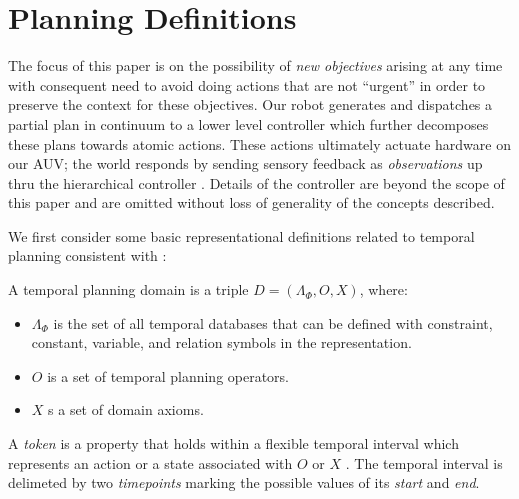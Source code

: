 \section{Planning Definitions}
\label{sec: defs}

The focus of this paper is on the possibility of \emph{new objectives}
arising at any time with consequent need to avoid doing actions that
are not ``urgent'' in order to preserve the context for these
objectives. Our robot generates and dispatches a partial plan in
continuum to a lower level controller which further decomposes these
plans towards atomic actions. These actions ultimately actuate
hardware on our AUV; the world responds by sending sensory feedback as
\emph{observations} up thru the hierarchical controller
\cite{mcgann08bdup,rajan12dup}. Details of the controller are beyond
the scope of this paper and are omitted without loss of generality of
the concepts described.

We first consider some basic representational definitions related to
temporal planning consistent with \cite{Nau:2004}:


\begin{definition}
  \label{def:domain}
  A temporal planning domain is a triple $D = ( \Lambda_\Phi, O, X )$, where:
  \begin{itemize}
  \item $\Lambda_\Phi$ is the set of all temporal databases that can
    be defined with constraint, constant, variable, and relation
    symbols in the representation.
  \item $O$ is a set of temporal planning operators.
  \item $X$ s a set of domain axioms.
  \end{itemize}
\end{definition}

A \emph{token} is a property that holds within a flexible temporal
interval which represents an action or a state associated with $O$ or
$X$ \cite{py10dup}. The temporal interval is delimeted by two 
{\em timepoints} marking the possible values of its {\em start} and
{\em end}.

